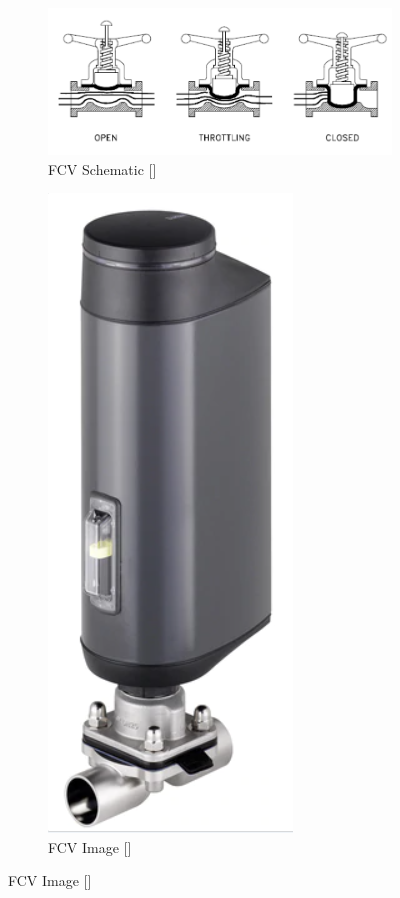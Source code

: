 \begin{figure}[H]
    \centering
    \begin{subfigure}{0.49\linewidth}
        \includegraphics[width=\linewidth]{chapters/Z-support/figures/fcv_diagram.PNG}
        \caption{FCV Schematic []}
    \end{subfigure}
    \begin{subfigure}{0.49\linewidth}
        \includegraphics[width=0.49\linewidth]{chapters/Z-support/figures/fcv.PNG}
        \caption{FCV Image []}
    \end{subfigure}
\end{figure}

